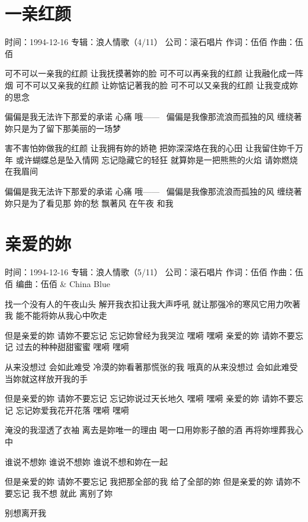 \documentclass[UTF8,a4paper,oneside,twocolumn,12pt]{ctexbook}
\newcommand{\infopair}[2]{\textbullet #1：#2}
\newcommand{\zc}[1][伍佰]{\infopair{作词}{#1}}
\newcommand{\zq}[1][伍佰]{\infopair{作曲}{#1}}
\newcommand{\bq}[1][伍佰]{\infopair{编曲}{#1}}
\newcommand{\zj}[1]{\infopair{专辑}{#1}}
\newcommand{\sj}[1]{\infopair{时间}{#1}}
\newcommand{\gs}[1]{\infopair{公司}{#1}}
\newenvironment{info}{\begin{flushleft}\kaishu
	}
	{\end{flushleft}\normalsize\yahei\par}
\newenvironment{lyric}{
	}
{}
\begin{document}
\section{一亲红颜}
\begin{info}
	\sj{1994-12-16}
	\zj{浪人情歌（4/11）}
	\gs{滚石唱片}
	\zc
	\zq
\end{info}
\begin{lyric}
	可不可以一亲我的红颜 让我抚摸著妳的脸
	可不可以再亲我的红颜 让我融化成一阵烟
	可不可以又亲我的红颜 让妳惦记著我的脸
	可不可以又亲我的红颜 让我变成妳的思念

	偏偏是我无法许下那爱的承诺 心痛 哦——~
	偏偏是我像那流浪而孤独的风
	缠绕著妳只是为了留下那美丽的一场梦

	害不害怕妳做我的红颜 让我拥有妳的娇艳
	把妳深深烙在我的心田 让我留住妳千万年
	或许蝴蝶总是坠入情网 忘记隐藏它的轻狂
	就算妳是一把熊熊的火焰 请妳燃烧在我眉间

	偏偏是我无法许下那爱的承诺 心痛 哦——~
	偏偏是我像那流浪而孤独的风
	缠绕著妳只是为了看见那
	妳的愁 飘著风 在午夜 和我
\end{lyric}

\section{亲爱的妳}
\begin{info}
	\sj{1994-12-16}
	\zj{浪人情歌（5/11）}
	\gs{滚石唱片}
	\zc
	\zq
	\bq[伍佰 \& China Blue]
\end{info}
\begin{lyric}
	找一个没有人的午夜山头
	解开我衣扣让我大声呼吼
	就让那强冷的寒风它用力吹著我
	能不能将妳从我心中吹走

	但是亲爱的妳 请妳不要忘记
	忘记妳曾经为我哭泣 嘿嗬 嘿嗬
	亲爱的妳 请妳不要忘记
	过去的种种甜甜蜜蜜 嘿嗬 嘿嗬

	从来没想过 会如此难受
	冷漠的妳看著那慌张的我
	哦真的从来没想过 会如此难受
	当妳就这样放开我的手

	但是亲爱的妳 请妳不要忘记
	忘记妳说过天长地久 嘿嗬 嘿嗬
	亲爱的妳 请妳不要忘记
	忘记妳爱我花开花落 嘿嗬 嘿嗬

	淹没的我湿透了衣袖
	离去是妳唯一的理由
	喝一口用妳影子酿的酒
	再将妳埋葬我心中

	谁说不想妳
	谁说不想妳
	谁说不想和妳在一起

	但是亲爱的妳 请妳不要忘记
	我把那全部的我 给了全部的妳
	但是亲爱的妳 请妳不要忘记
	我不想 就此 离别了妳

	别想离开我
\end{lyric}
\end{document}
